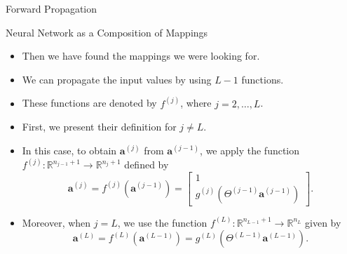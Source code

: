 \documentclass[8pt,american]{beamer}
\begin{document}
\begin{frame}{Forward Propagation}

\begin{block}{Neural Network as a Composition of Mappings}
\begin{itemize}
\justifying
\item Then we have found the mappings we were looking for.
\item We can propagate the input values by using $L-1$ functions.
\item These functions are denoted by $f^{\left(j\right)}$, where
  $j=2,\ldots,L$.
\item First, we present their definition for $j\neq L$.
\item In this case, to obtain $\mathbf{a}^{\left(j\right)}$ from
  $\mathbf{a}^{\left(j-1\right)}$, we apply the function
  $f^{\left(j\right)}:\mathbb{R}^{n_{j-1}+1}\rightarrow\mathbb{R}^{n_{j}+1}$
  defined by
  \begin{equation}
  \mathbf{a}^{\left(j\right)}=f^{\left(j\right)}\left(\mathbf{a}^{\left(j-1\right)}\right)=\begin{bmatrix}1\\
  g^{\left(j\right)}\left(\Theta^{\left(j-1\right)}\mathbf{a}^{\left(j-1\right)}\right)
  \end{bmatrix}.
  \end{equation}
\item Moreover, when $j=L$, we use the function
  $f^{\left(L\right)}:\mathbb{R}^{n_{L-1}+1}\rightarrow\mathbb{R}^{n_{L}}$
  given by
  \begin{equation}
  \mathbf{a}^{\left(L\right)}=f^{\left(L\right)}\left(\mathbf{a}^{\left(L-1\right)}\right)=g^{\left(L\right)}\left(\Theta^{\left(L-1\right)}\mathbf{a}^{\left(L-1\right)}\right).
  \end{equation}
\end{itemize}
\end{block}

\end{frame}
\end{document}
